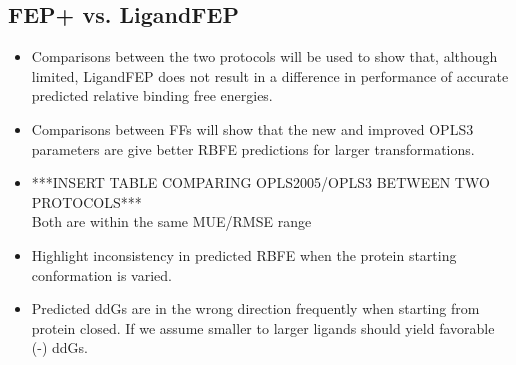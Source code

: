 \documentclass{article}
\begin{document}
\subsection{FEP+ vs. LigandFEP}
   \begin{itemize}
   \item Comparisons between the two protocols will be used to show that, although limited, LigandFEP does not result in a difference in performance of accurate predicted relative binding free energies.
   \item Comparisons between FFs will show that the new and improved OPLS3 parameters are give better RBFE predictions for larger transformations.
   \item ***INSERT TABLE COMPARING OPLS2005/OPLS3 BETWEEN TWO PROTOCOLS***
      \\ Both are within the same MUE/RMSE range
   \item Highlight inconsistency in predicted RBFE when the protein starting conformation is varied.
   \item Predicted ddGs are in the wrong direction frequently when starting from protein closed. 
      If we assume smaller to larger ligands should yield favorable (-) ddGs.
   \end{itemize}
\end{document}
